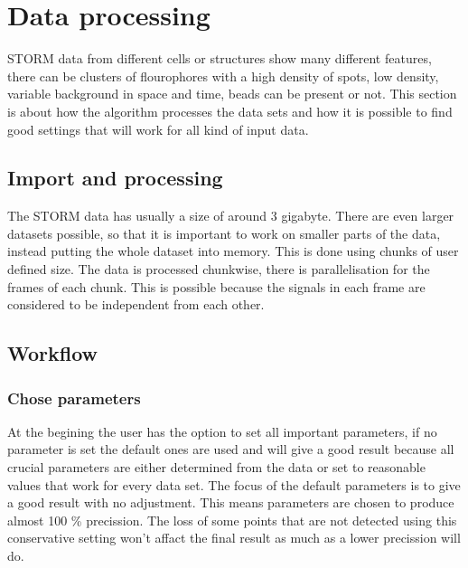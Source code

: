 \chapter{Data processing}
STORM data from different cells or structures show many different features, there can be clusters of flourophores with a high density of spots, low density, variable background in space and time, beads can be present or not. This section is about how the algorithm processes the data sets and how it is possible to find good settings that will work for all kind of input data. 


\section{Import and processing}
The STORM data has usually a size of around 3 gigabyte. There are even larger datasets possible, so that it is important to work on smaller parts of the data, instead putting the whole dataset into memory. This is done using chunks of user defined size. The data is processed chunkwise, there is parallelisation for the frames of each chunk. This is possible because the signals in each frame are considered to be independent from each other.  

\section{Workflow}
\subsection{Chose parameters}
At the begining the user has the option to set all important parameters, if no parameter is set the default ones are used and will give a good result because all crucial parameters are either determined from the data or set to reasonable values that work for every data set. The focus of the default parameters is to give a good result with no adjustment. This means parameters are chosen to produce almost 100 \% precission. The loss of some points that are not detected using this conservative setting won't affact the final result as much as a lower precission will do.
